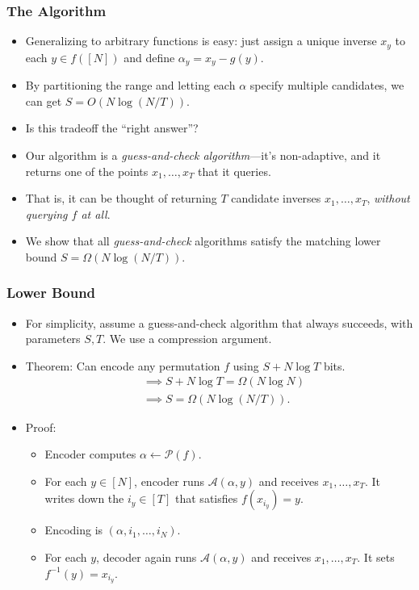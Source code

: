 \documentclass[usenames, dvipsnames, t, table]{beamer}
\newcommand{\A}{\mathcal{A}}
\renewcommand{\P}{\mathcal{P}}
\begin{document}
  \begin{frame}
    \frametitle{The Algorithm}
    \begin{itemize}
    \item Generalizing to arbitrary functions is easy: just assign a unique inverse $x_y$ to each $y \in f([N])$ and define $\alpha_y = x_y - g(y)$.
      \pause
    \item By partitioning the range and letting each $\alpha$ specify multiple candidates, we can get $S = O(N \log (N / T))$.
      \pause
    \item Is this tradeoff the ``right answer''?
      \pause
    \item Our algorithm is a \emph{guess-and-check algorithm}---it's non-adaptive, and it returns one of the points $x_1, \dots, x_T$ that it queries.
      \pause
    \item That is, it can be thought of returning $T$ candidate inverses $x_1, \dots, x_T$, \emph{without querying $f$ at all}.
      \pause
    \item
      We show that all \emph{guess-and-check} algorithms satisfy the matching lower bound $S = \Omega(N \log (N/T))$.
    \end{itemize}
  \end{frame}

  \begin{frame}
    \frametitle{Lower Bound}
    \begin{itemize}
    \item For simplicity, assume a guess-and-check algorithm that always succeeds, with parameters $S, T$. We use a compression argument.
      \pause
    \item Theorem: Can encode any permutation $f$ using $S + N \log T$ bits.
      \pause
      \begin{align*}
        &\implies S + N \log T = \Omega(N \log N) \\
        &\implies S = \Omega(N \log (N/T)).
      \end{align*}
      \mypause
    \item Proof:
      \begin{itemize}
\item      Encoder computes $\alpha \gets \P(f)$.
      \pause
    \item For each $y \in [N]$, encoder runs $\A(\alpha, y)$ and receives $x_1, \dots, x_T$. It writes down the $i_y \in [T]$ that satisfies $f(x_{i_y}) = y$.
      \pause
    \item Encoding is $(\alpha, i_1, \dots, i_N)$.
      \pause
    \item For each $y$, decoder again runs $\A(\alpha, y)$ and receives $x_1, \dots, x_T$. It sets $f^{-1}(y) = x_{i_y}$.
    \end{itemize}
          \end{itemize}

      \end{frame}
\end{document}
